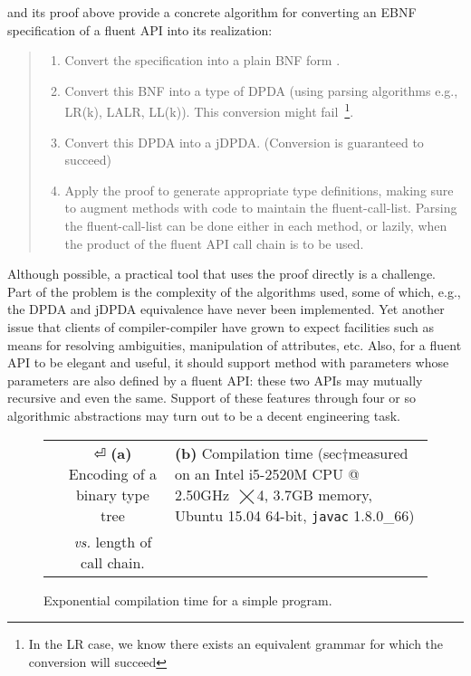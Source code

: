  and its proof above provide
  a concrete algorithm for converting an EBNF specification of a fluent API into
its realization:
\begin{quote}
  \begin{enumerate}
    \item Convert the specification into a plain BNF form
    .
    \item Convert this BNF into a type of DPDA (using parsing algorithms e.g., LR(k), LALR\@, LL(k)). 
        This conversion might 
        fail~\footnote{In the LR case, we know\cite{Knuth:i:think} there exists an equivalent grammar for which the conversion will succeed}.
    \item Convert this DPDA into a jDPDA. (Conversion is guaranteed to succeed)
    \item Apply the proof to generate appropriate \Java type definitions, making sure to
        augment methods with code to maintain the fluent-call-list.
        Parsing the fluent-call-list can be done either in each method,
        or lazily, when the product of the fluent API call chain is to
        be used.
  \end{enumerate}
\end{quote}
Although possible, a practical tool that uses the proof directly 
  is a challenge. 
Part of the problem is the complexity of the 
  algorithms used, some of which, e.g., the DPDA and jDPDA equivalence have never been 
  implemented.
Yet another issue that clients of compiler-compiler have grown to expect 
  facilities such as means for resolving ambiguities, manipulation 
  of attributes, etc.
Also, for a fluent API to be elegant and useful, 
  it should support method with parameters whose parameters are also defined by a  fluent API:
these two APIs may mutually recursive and even the same. 
Support of these features through four or so algorithmic abstractions 
  may turn out to be a decent engineering task.

\begin{figure}[H]
  \caption{\label{Figure:compiler} Exponential compilation time for a simple \Java program.
  }
  \begin{minipage}{\textwidth}
  \begin{tabular}{@{}c@{}c@{}}
    \hspace{3ex}\parbox[c]{44ex}{} &
    \hspace{0ex} \parbox[c]{44ex}{}⏎
      \textbf{(a)} Encoding of a binary type tree 
    & 
      \textbf{(b)} Compilation time 
      (sec†{\scriptsize{measured on an Intel i5-2520M CPU @ 2.50GHz~$⨉$4, 3.7GB memory, Ubuntu 15.04 64-bit, \texttt{javac} 1.8.0\_66}})%
    \\ &
     \emph{vs.}
      length of call chain.
  \end{tabular}
  \end{minipage}
\end{figure}


